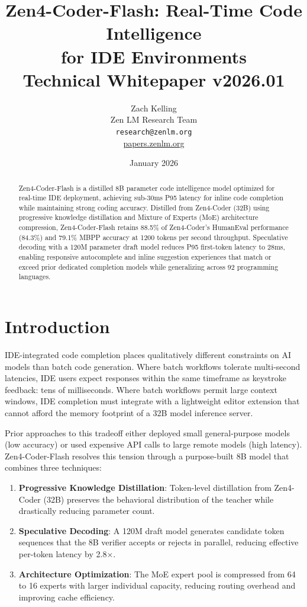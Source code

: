 \documentclass[11pt,a4paper]{article}
\title{\textbf{Zen4-Coder-Flash: Real-Time Code Intelligence\\
for IDE Environments}\\[0.5em]
\large Technical Whitepaper v2026.01}
\author{Zach Kelling \\ Zen LM Research Team\\
\texttt{research@zenlm.org}\\
\href{https://papers.zenlm.org}{papers.zenlm.org}}
\date{January 2026}
\begin{document}
\maketitle

\begin{abstract}
Zen4-Coder-Flash is a distilled 8B parameter code intelligence model optimized for real-time IDE deployment, achieving sub-30ms P95 latency for inline code completion while maintaining strong coding accuracy. Distilled from Zen4-Coder (32B) using progressive knowledge distillation and Mixture of Experts (MoE) architecture compression, Zen4-Coder-Flash retains 88.5\% of Zen4-Coder's HumanEval performance (84.3\%) and 79.1\% MBPP accuracy at 1200 tokens per second throughput. Speculative decoding with a 120M parameter draft model reduces P95 first-token latency to 28ms, enabling responsive autocomplete and inline suggestion experiences that match or exceed prior dedicated completion models while generalizing across 92 programming languages.
\end{abstract}

\tableofcontents
\newpage

\section{Introduction}

IDE-integrated code completion places qualitatively different constraints on AI models than batch code generation. Where batch workflows tolerate multi-second latencies, IDE users expect responses within the same timeframe as keystroke feedback: tens of milliseconds. Where batch workflows permit large context windows, IDE completion must integrate with a lightweight editor extension that cannot afford the memory footprint of a 32B model inference server.

Prior approaches to this tradeoff either deployed small general-purpose models (low accuracy) or used expensive API calls to large remote models (high latency). Zen4-Coder-Flash resolves this tension through a purpose-built 8B model that combines three techniques:

\begin{enumerate}
  \item \textbf{Progressive Knowledge Distillation}: Token-level distillation from Zen4-Coder (32B) preserves the behavioral distribution of the teacher while drastically reducing parameter count.
  \item \textbf{Speculative Decoding}: A 120M draft model generates candidate token sequences that the 8B verifier accepts or rejects in parallel, reducing effective per-token latency by 2.8$\times$.
  \item \textbf{Architecture Optimization}: The MoE expert pool is compressed from 64 to 16 experts with larger individual capacity, reducing routing overhead and improving cache efficiency.
\end{enumerate}
\end{document}
